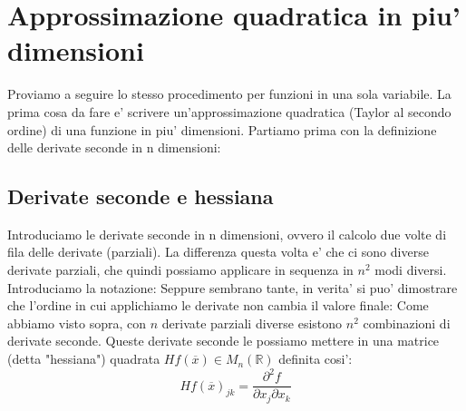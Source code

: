 \documentclass{report}
\begin{document}
\section{Approssimazione quadratica in piu' dimensioni}
Proviamo a seguire lo stesso procedimento per funzioni in una sola variabile. La prima cosa da fare e' scrivere un'approssimazione quadratica (Taylor al secondo ordine) di una funzione in piu' dimensioni. Partiamo prima con la definizione delle derivate seconde in n dimensioni:
\subsection{Derivate seconde e hessiana}
Introduciamo le derivate seconde in n dimensioni, ovvero il calcolo due volte di fila delle derivate (parziali). La differenza questa volta e' che ci sono diverse derivate parziali, che quindi possiamo applicare in sequenza in $ n^2 $ modi diversi. Introduciamo la notazione:
Seppure sembrano tante, in verita' si puo' dimostrare che l'ordine in cui applichiamo le derivate non cambia il valore finale:
Come abbiamo visto sopra, con $ n $ derivate parziali diverse esistono $ n^2 $ combinazioni di derivate seconde. Queste derivate seconde le possiamo mettere in una matrice (detta "hessiana") quadrata $ Hf(\overline{x}) \in M_n(\mathbb{R}) $ definita cosi':
\[
  Hf(\overline{x})_{jk} = \frac{\partial^2 f}{\partial x_j \partial x_k }
\]
\end{document}
